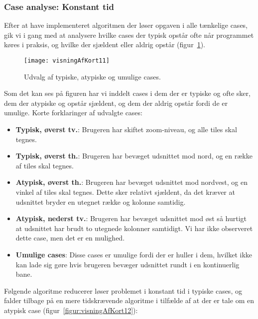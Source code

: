 \subsubsection{Case analyse: Konstant tid}
\label{subsec:caseAnalyse}

Efter at have implementeret algoritmen der løser opgaven i alle tænkelige cases, gik vi i gang med at analysere hvilke cases der typisk opstår ofte når programmet køres i praksis, og hvilke der sjældent eller aldrig opstår (figur~\ref{figur:visningAfKort11}).

\begin{figure}[h]
	\centering
	\texttt{[image: visningAfKort11]}
	\captionsetup{width=0.8\textwidth}
	\caption{Udvalg af typiske, atypiske og umulige cases.}
	\label{figur:visningAfKort11}
\end{figure}

Som det kan ses på figuren har vi inddelt cases i dem der er typiske og ofte sker, dem der atypiske og opstår sjældent, og dem der aldrig opstår fordi de er umulige. Korte forklaringer af udvalgte cases:

\begin{itemize}
	\item \textbf{Typisk, øverst tv.}: Brugeren har skiftet zoom-niveau, og alle tiles skal tegnes.
	\item \textbf{Typisk, øverst th.}: Brugeren har bevæget udsnittet mod nord, og en række af tiles skal tegnes.
	\item \textbf{Atypisk, øverst th.}: Brugeren har bevæget udsnittet mod nordvest, og en vinkel af tiles skal tegnes. Dette sker relativt sjældent, da det kræver at udsnittet bryder en utegnet række og kolonne samtidig.
	\item \textbf{Atypisk, nederst tv.}: Brugeren har bevæget udsnittet mod øst så hurtigt at udsnittet har brudt to utegnede kolonner samtidigt. Vi har ikke observeret dette case, men det er en mulighed.
	\item \textbf{Umulige cases}: Disse cases er umulige fordi der er huller i dem, hvilket ikke kan lade sig gøre hvis brugeren bevæger udsnittet rundt i en kontinuerlig bane.
\end{itemize}

Følgende algoritme reducerer løser problemet i konstant tid i typiske cases, og falder tilbage på en mere tidskrævende algoritme i tilfælde af at der er tale om en atypisk case (figur~\ref{figur:visningAfKort12}):

